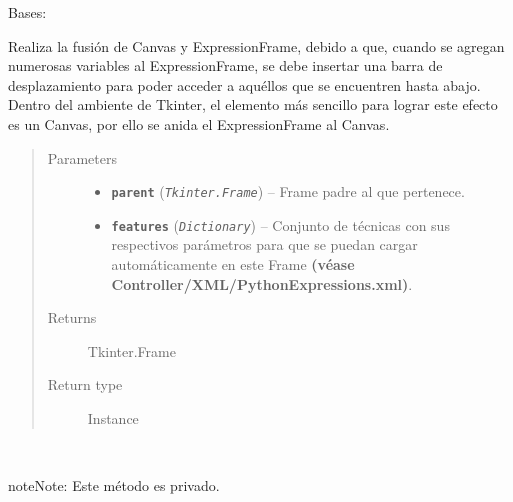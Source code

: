 \documentclass[letterpaper,10pt,english]{sphinxmanual}
\begin{document}
\begin{fulllineitems}
\label{View/Additional/MenuInternalOption/InternalOptionTab/PythonExpressionFrame:View.Additional.MenuInternalOption.InternalOptionTab.PythonExpressionFrame.PythonExpressionFrame}
Bases: 

\begin{DUlineblock}{0em}
\item[] Realiza la fusión de Canvas y ExpressionFrame, debido a que, cuando se agregan 
numerosas variables al ExpressionFrame, se debe insertar una barra de desplazamiento
para poder acceder a aquéllos que se encuentren hasta abajo. Dentro del ambiente
de Tkinter, el elemento más sencillo para lograr este efecto es un Canvas, por ello 
se anida el ExpressionFrame al Canvas.
\end{DUlineblock}
\begin{quote}\begin{description}
\item[{Parameters}] \leavevmode\begin{itemize}
\item {} 
\textbf{\texttt{parent}} (\emph{\texttt{Tkinter.Frame}}) -- Frame padre al que pertenece.

\item {} 
\textbf{\texttt{features}} (\emph{\texttt{Dictionary}}) -- Conjunto de técnicas con sus respectivos parámetros para que
se puedan cargar automáticamente en este Frame \textbf{(véase
Controller/XML/PythonExpressions.xml)}.

\end{itemize}

\item[{Returns}] \leavevmode
Tkinter.Frame

\item[{Return type}] \leavevmode
Instance

\end{description}\end{quote}

\begin{fulllineitems}
\label{View/Additional/MenuInternalOption/InternalOptionTab/PythonExpressionFrame:View.Additional.MenuInternalOption.InternalOptionTab.PythonExpressionFrame.PythonExpressionFrame._PythonExpressionFrame__activate_scroll}~
\begin{notice}{note}{Note:}
Este método es privado.
\end{notice}


\end{fulllineitems}
\end{fulllineitems}
\end{document}
